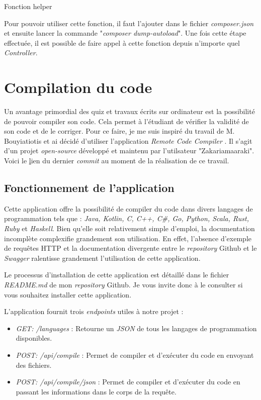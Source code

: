 \begin{listing}[H]
    \inputminted{php}{assets/code/enumValues.php}
    \caption{Fonction helper}
\end{listing}

Pour pouvoir utiliser cette fonction, il faut l'ajouter dans le fichier \emph{composer.json} et ensuite lancer la commande "\emph{composer dump-autoload}". Une fois cette étape  effectuée, il est possible de faire appel à cette fonction depuis n'importe quel \emph{Controller}.


\section{Compilation du code}
Un avantage primordial des quiz et travaux écrits sur ordinateur est la possibilité de pouvoir compiler son code. Cela permet à l'étudiant de vérifier la validité de son code et de le corriger. Pour ce faire, je me suis inspiré du travail de M. Bouyiatiotis et ai décidé d'utiliser l'application \emph{Remote Code Compiler} \cite{RemoteCodeCompiler}. Il s'agit d'un projet \emph{open-source} développé et maintenu par l'utilsateur "Zakariamaaraki". Voici le \href{https://github.com/heig-vd-tin/heig-quiz/commit/28fb1ac5367931f6aa986041fb992c651c9816cd}lien du dernier {\emph{commit}} au moment de la réalisation de ce travail.

\subsection{Fonctionnement de l'application}

Cette application offre la possibilité de compiler du code dans divers langages de programmation tels que : \emph{Java, Kotlin, C, C++, C\#, Go, Python, Scala, Rust, Ruby} et \emph{Haskell}.
Bien qu'elle soit relativement simple d'emploi, la documentation incomplète complexifie grandement son utilisation. En effet, l'absence d'exemple de requêtes HTTP et la documentation divergente entre le \emph{repository} Github et le \emph{Swagger} ralentisse grandement l'utilisation de cette application.

Le processus d'installation de cette application est détaillé dans le fichier \emph{README.md} de mon \emph{repository} Github. Je vous invite donc à le consulter si vous souhaitez installer cette application.

L'application fournit trois \emph{endpoints} utiles à notre projet :
\begin{itemize}
    \item \emph{GET: /languages} : Retourne un \emph{JSON} de tous les langages de programmation disponibles.
    \item \emph{POST: /api/compile} : Permet de compiler et d'exécuter du code en envoyant des fichiers.
    \item \emph{POST: /api/compile/json} : Permet de compiler et d'exécuter du code en passant les informations dans le corps de la requête.
\end{itemize}


